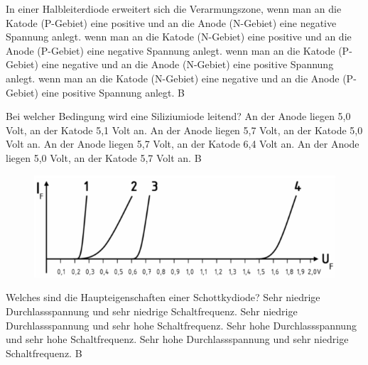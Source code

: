 {In einer Halbleiterdiode erweitert sich die Verarmungszone,}%
{wenn man an die Katode (P-Gebiet) eine positive und an die Anode (N-Gebiet) eine negative Spannung anlegt.}%
{wenn man an die Katode (N-Gebiet) eine positive und an die Anode (P-Gebiet) eine negative Spannung anlegt.}%
{wenn man an die Katode (P-Gebiet) eine negative und an die Anode (N-Gebiet) eine positive Spannung anlegt.}%
{wenn man an die Katode (N-Gebiet) eine negative und an die Anode (P-Gebiet) eine positive Spannung anlegt.}%
{B}%

\vspace*{0.65cm}

{Bei welcher Bedingung wird eine Siliziumiode leitend?}%
{An der Anode liegen 5,0 Volt, an der Katode 5,1 Volt an.}%
{An der Anode liegen 5,7 Volt, an der Katode 5,0 Volt an.}%
{An der Anode liegen 5,7 Volt, an der Katode 6,4 Volt an.}%
{An der Anode liegen 5,0 Volt, an der Katode 5,7 Volt an.}%
{B}%


\begin{figure}[H]
	\centering
	\includegraphics[scale=0.4]{Diode/Bilder/TC510a.png}
	\end{figure}

{Welches sind die Haupteigenschaften einer Schottkydiode?}%
{Sehr niedrige Durchlassspannung und sehr niedrige Schaltfrequenz.}%
{Sehr niedrige Durchlassspannung und sehr hohe Schaltfrequenz.}%
{Sehr hohe Durchlassspannung und sehr hohe Schaltfrequenz.}%
{Sehr hohe Durchlassspannung und sehr niedrige Schaltfrequenz.}%
{B}%



